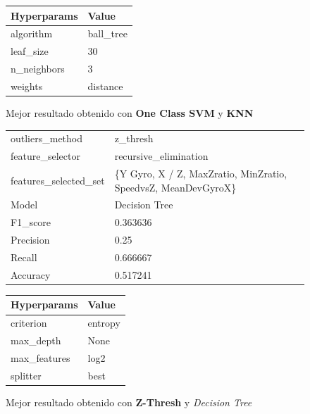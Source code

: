 \begin{appendices}
\begin{figure}[htb]
			\begin{tabular}{ll}
				\toprule
				Hyperparams &     Value \\
				\midrule
				  algorithm & ball\_tree \\
				  leaf\_size &        30 \\
				n\_neighbors &         3 \\
					weights &  distance \\
				\bottomrule
			\end{tabular}
			\caption{Mejor resultado obtenido con \textbf{One Class SVM} y \textbf{KNN}}
			\label{table:20}
		\end{figure}

		\begin{figure}[htb]
			\centering
			\begin{tabular}{ll}
				\toprule
					  outliers\_method &                                           z\_thresh \\
					 feature\_selector &                              recursive\_elimination \\
					 features\_selected\_set & \{Y Gyro, X / Z, MaxZratio, MinZratio, SpeedvsZ, MeanDevGyroX\} \\
								Model &                                      Decision Tree \\
						F1\_score &                                           0.363636 \\
					   Precision &                                               0.25 \\
						  Recall &                                           0.666667 \\
						Accuracy &                                           0.517241 \\
				\bottomrule
			\end{tabular}
			\newline
			\newline

			\begin{tabular}{ll}
			\toprule
			 Hyperparams &   Value \\
			\midrule
			   criterion & entropy \\
			   max\_depth &    None \\
			max\_features &    log2 \\
				splitter &    best \\
			\bottomrule
			\end{tabular}
			\caption{Mejor resultado obtenido con \textbf{Z-Thresh} y \emph{Decision Tree}}
			\label{table:21}
		\end{figure}


\end{appendices}
